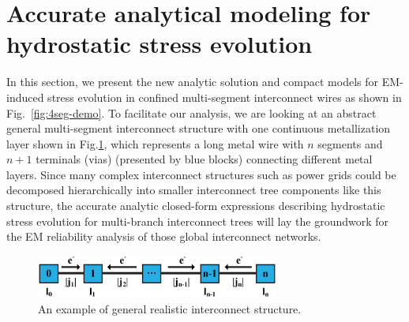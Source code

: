 \section{Accurate analytical modeling for hydrostatic stress evolution}
\label{sec:multi_segment}

In this section, we present the new analytic solution and compact
models for EM-induced stress evolution in confined multi-segment
interconnect wires as shown in Fig.~\ref{fig:4seg-demo}. To facilitate
our analysis, we are looking at an abstract general multi-segment
interconnect structure with one continuous metallization layer shown in
Fig.\ref{fig:interconnect_tree}, which represents a long metal wire
with $n$ segments and $n+1$ terminals (vias) (presented by blue blocks)
connecting different metal layers.  Since many complex interconnect
structures such as power grids could be decomposed hierarchically into
smaller interconnect tree components like this structure, the accurate
analytic closed-form expressions describing hydrostatic stress
evolution for multi-branch interconnect trees will lay the groundwork
for the EM reliability analysis of those global interconnect networks.

\label{sec:analytical_stress}
\begin{figure}[ht] \centering
\includegraphics[width=80mm]{Sn.eps}
\caption{An example of general realistic interconnect structure.}
  \label{fig:interconnect_tree}
  \vspace{-0.12in}
\end{figure}

